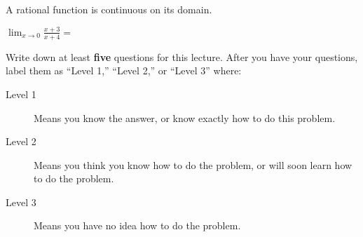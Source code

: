 \documentclass{ximera}
\begin{document}
 \begin{question}
 	\begin{hint}
		A rational function is continuous on its domain.
	\end{hint}
  	 $\displaystyle\lim_{x \to 0}\frac{x+3}{x+4}=$
  \end{question}  
  

Write down at least \textbf{five} questions for this lecture. After
you have your questions, label them as ``Level 1,'' ``Level 2,'' or ``Level 3'' where:
\begin{description}
\item[Level 1] Means you know the answer, or know exactly how to do this problem.
\item[Level 2] Means you think you know how to do the problem, or will soon learn how to do the problem.
\item[Level 3] Means you have no idea how to do the problem. 
\end{description}
\begin{question}
  \begin{freeResponse}
  \end{freeResponse}
\end{question}
\end{document}
